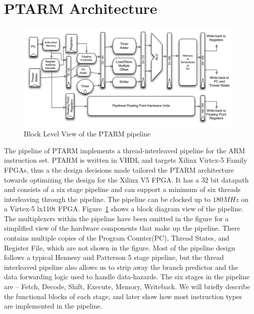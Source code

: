 \section{PTARM Architecture}
\begin{figure}
  \vspace{-20pt}
  \begin{center}
    \includegraphics[scale=.6]{figs/ptarm_pipeline}
  \end{center}
  \vspace{-20pt}
  \caption{Block Level View of the PTARM pipeline}
  \label{fig:ptarm_pipeline}
\end{figure}

The pipeline of PTARM implements a thread-interleaved pipeline for the ARM instruction set.
PTARM is written in VHDL and targets Xilinx Virtex-5 Family FPGAs, thus a the design decisions made tailored the PTARM architecture towards optimizing the design for the Xilinx V5 FPGA.
It has a 32 bit datapath and consists of a six stage pipeline and can support a minimum of six threads interleaving through the pipeline.
The pipeline can be clocked up to $180MHz$ on a Virtex-5 lx110t FPGA.  
Figure~\ref{fig:ptarm_pipeline} shows a block diagram view of the pipeline. 
The multiplexers within the pipeline have been omitted in the figure for a simplified view of the hardware components that make up the pipeline.
There contains multiple copies of the Program Counter(PC), Thread States, and Register File, which are not shown in the figure.
Most of the pipeline design follows a typical Hennesy and Patterson 5 stage pipeline, but the thread interleaved pipeline also allows us to strip away the branch predictor and the data forwarding logic used to handle data-hazards.
The six stages in the pipeline are -- Fetch, Decode, Shift, Execute, Memory, Writeback.
We will briefly describe the functional blocks of each stage, and later show how most instruction types are implemented in the pipeline.  

